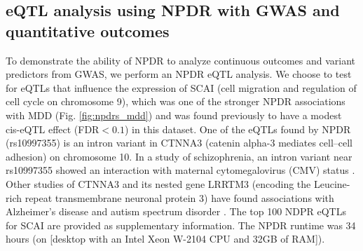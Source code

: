 \documentclass[10pt]{article}
\begin{document}
% 

\subsection{eQTL analysis using NPDR with GWAS and quantitative outcomes}

To demonstrate the ability of NPDR to analyze continuous outcomes and variant predictors from GWAS, we perform an NPDR eQTL analysis.
We choose to test for eQTLs that influence the expression of SCAI (cell migration and regulation of cell cycle on chromosome 9), which was one of the stronger NPDR associations with MDD (Fig. \ref{fig:npdrs_mdd}) and was found previously to have a modest cis-eQTL effect (FDR$<0.1$) in this dataset\cite{mostafavi14}.
One of the eQTLs found by NPDR (rs10997355) is an intron variant in CTNNA3 (catenin alpha-3 mediates cell–cell adhesion) on chromosome 10.
In a study of schizophrenia, an intron variant near rs10997355 showed an interaction with maternal cytomegalovirus (CMV) status \cite{borglum2014genome}.
Other studies of CTNNA3 and its nested gene LRRTM3 (encoding the Leucine-rich repeat transmembrane neuronal protein 3) have found associations with Alzheimer's disease \cite{miyashita2007genetic} and autism spectrum disorder \cite{wang2009common}.
The top 100 NDPR eQTLs for SCAI are provided as supplementary information.
The NPDR runtime was 34 hours (on [desktop with an Intel Xeon W-2104 CPU and 32GB of RAM]).
\end{document}
